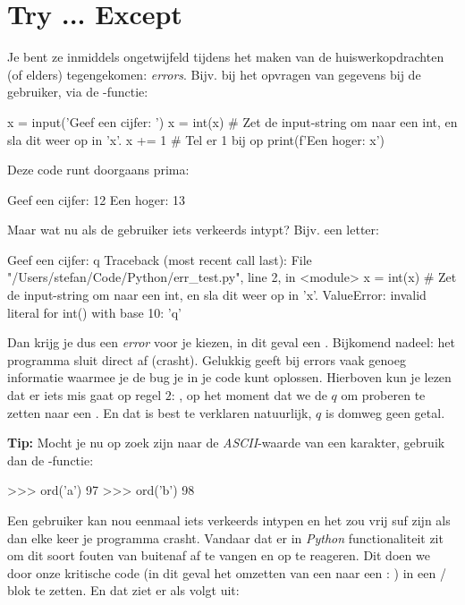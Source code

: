 \section{Try ... Except}
Je bent ze inmiddels ongetwijfeld tijdens het maken van de huiswerkopdrachten (of elders) tegengekomen: \textit{errors}. Bijv. bij het opvragen van gegevens bij de gebruiker, via de -functie:
\begin{python}
x = input('Geef een cijfer: ')
x = int(x)  # Zet de input-string om naar een int, en sla dit weer op in 'x'.
x += 1  # Tel er 1 bij op
print(f'Een hoger: {x}')
\end{python}
Deze code runt doorgaans prima:
\begin{python}
Geef een cijfer: 12
Een hoger: 13
\end{python}
Maar wat nu als de gebruiker iets verkeerds intypt? Bijv. een letter:
\begin{python}
Geef een cijfer: q
Traceback (most recent call last):
  File "/Users/stefan/Code/Python/err_test.py", line 2, in <module>
    x = int(x)  # Zet de input-string om naar een int, en sla dit weer op in 'x'.
ValueError: invalid literal for int() with base 10: 'q'
\end{python}
Dan krijg je dus een \textit{error} voor je kiezen, in dit geval een . Bijkomend nadeel: het programma sluit direct af (crasht). Gelukkig geeft  bij errors vaak genoeg informatie waarmee je de bug je in je code kunt oplossen. Hierboven kun je lezen dat er iets mis gaat op regel $2$: , op het moment dat we de  $q$ om proberen te zetten naar een . En dat is best te verklaren natuurlijk, $q$ is domweg geen getal. 

\begin{remark}
\textbf{Tip: } Mocht je nu op zoek zijn naar de \textit{ASCII}-waarde van een karakter, gebruik dan de -functie:
\begin{python}
>>> ord('a')
97
>>> ord('b')
98
\end{python}
\end{remark}

Een gebruiker kan nou eenmaal iets verkeerds intypen en het zou vrij suf zijn als dan elke keer je programma crasht. Vandaar dat er in \textit{Python} functionaliteit zit om dit soort fouten van buitenaf af te vangen en op te reageren. Dit doen we door onze kritische code (in dit geval het omzetten van een  naar een : ) in een  /  blok te zetten. En dat ziet er als volgt uit:


